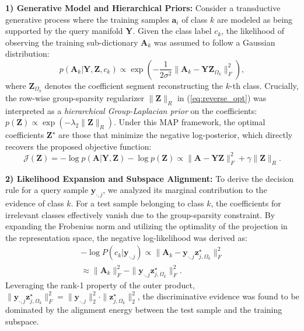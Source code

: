 \documentclass[10pt,comsoc]{IEEEtran}
\begin{document}
\textbf{1) Generative Model and Hierarchical Priors:}
Consider a transductive generative process where the training samples $\mathbf{a}_i$ of class $k$ are modeled as being supported by the query manifold $\mathbf{Y}$. Given the class label $c_k$, the likelihood of observing the training sub-dictionary $\mathbf{A}_k$ was assumed to follow a Gaussian distribution:
\begin{equation}
p(\mathbf{A}_k | \mathbf{Y}, \mathbf{Z}, c_k) \propto \exp \left( -\frac{1}{2\sigma^2} \|\mathbf{A}_k - \mathbf{YZ}_{\Omega_k}\|_F^2 \right),
\end{equation}
where $\mathbf{Z}_{\Omega_k}$ denotes the coefficient segment reconstructing the $k$-th class. Crucially, the row-wise group-sparsity regularizer $\|\mathbf{Z}\|_R$ in (\ref{eq:reverse_opt}) was interpreted as a \textit{hierarchical Group-Laplacian prior} on the coefficients: $p(\mathbf{Z}) \propto \exp(-\lambda_2 \|\mathbf{Z}\|_R)$. Under this MAP framework, the optimal coefficients $\mathbf{Z}^\star$ are those that minimize the negative log-posterior, which directly recovers the proposed objective function:
\begin{equation}
\label{eq:map_objective_unified}
\mathcal{J}(\mathbf{Z}) = -\log p(\mathbf{A} | \mathbf{Y}, \mathbf{Z}) - \log p(\mathbf{Z}) \propto \|\mathbf{A} - \mathbf{YZ}\|_F^2 + \gamma \|\mathbf{Z}\|_R.
\end{equation}

\textbf{2) Likelihood Expansion and Subspace Alignment:}
To derive the decision rule for a query sample $\mathbf{y}_{\cdot,j}$, we analyzed its marginal contribution to the evidence of class $k$. For a test sample belonging to class $k$, the coefficients for irrelevant classes effectively vanish due to the group-sparsity constraint. By expanding the Frobenius norm and utilizing the optimality of the projection in the representation space, the negative log-likelihood was derived as:
\begin{equation}
\label{eq:bayesian_approx_unified}
\begin{split}
-\log P(c_k | \mathbf{y}_{\cdot,j}) \propto \|\mathbf{A}_k - \mathbf{y}_{\cdot,j} \mathbf{z}_{j, \Omega_k}^\star\|_F^2 \\ 
\approx \|\mathbf{A}_k\|_F^2 - \|\mathbf{y}_{\cdot,j} \mathbf{z}_{j, \Omega_k}^\star\|_F^2.
\end{split}
\end{equation}
Leveraging the rank-1 property of the outer product, $\|\mathbf{y}_{\cdot,j} \mathbf{z}_{j, \Omega_k}^\star\|_F^2 = \|\mathbf{y}_{\cdot,j}\|_2^2 \cdot \|\mathbf{z}_{j, \Omega_k}^\star\|_2^2$, the discriminative evidence was found to be dominated by the alignment energy between the test sample and the training subspace.
\end{document}
